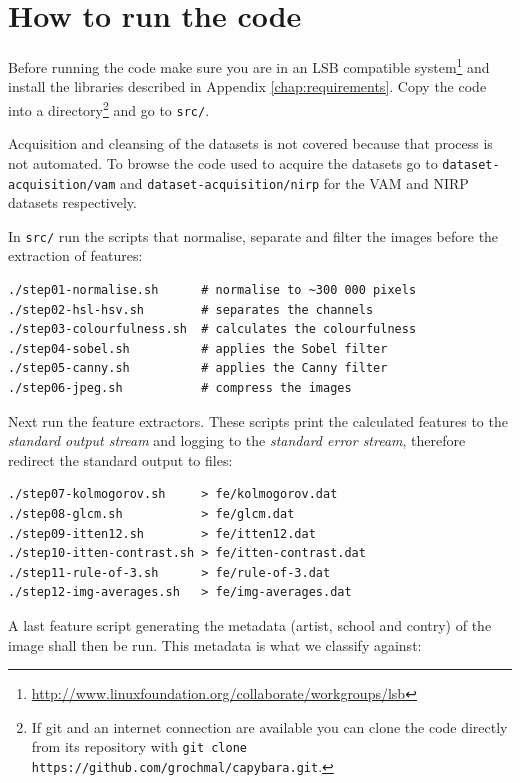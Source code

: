 \documentclass[11pt,a4paper,twoside,openright]{report}
\begin{document}
\chapter{How to run the code}
\label{chap:runthecode}

Before running the code make sure you are in an LSB compatible system\footnote{
\href{http://www.linuxfoundation.org/collaborate/workgroups/lsb}
{http://www.linuxfoundation.org/collaborate/workgroups/lsb}} and install the
libraries described in Appendix \ref{chap:requirements}.  Copy the code into a
directory\footnote{If git and an internet connection are available you can
clone the code directly from its repository with
\verb|git clone https://github.com/grochmal/capybara.git|.}
and go to \texttt{src/}.

Acquisition and cleansing of the datasets is not covered because that process
is not automated.  To browse the code used to acquire the datasets go to
\texttt{dataset-acquisition/vam} and \texttt{dataset-acquisition/nirp} for the
VAM and NIRP datasets respectively.

In \texttt{src/} run the scripts that normalise, separate and filter the images
before the extraction of features:

\begin{Verbatim}[frame=leftline]
./step01-normalise.sh      # normalise to ~300 000 pixels
./step02-hsl-hsv.sh        # separates the channels
./step03-colourfulness.sh  # calculates the colourfulness
./step04-sobel.sh          # applies the Sobel filter
./step05-canny.sh          # applies the Canny filter
./step06-jpeg.sh           # compress the images
\end{Verbatim}

Next run the feature extractors.  These scripts print the calculated features
to the \emph{standard output stream} and logging to the \emph{standard error
stream}, therefore redirect the standard output to files:

\begin{Verbatim}[frame=leftline]
./step07-kolmogorov.sh     > fe/kolmogorov.dat
./step08-glcm.sh           > fe/glcm.dat
./step09-itten12.sh        > fe/itten12.dat
./step10-itten-contrast.sh > fe/itten-contrast.dat
./step11-rule-of-3.sh      > fe/rule-of-3.dat
./step12-img-averages.sh   > fe/img-averages.dat
\end{Verbatim}

A last feature script generating the metadata (artist, school and contry) of
the image shall then be run.  This metadata is what we classify against:
\end{document}
